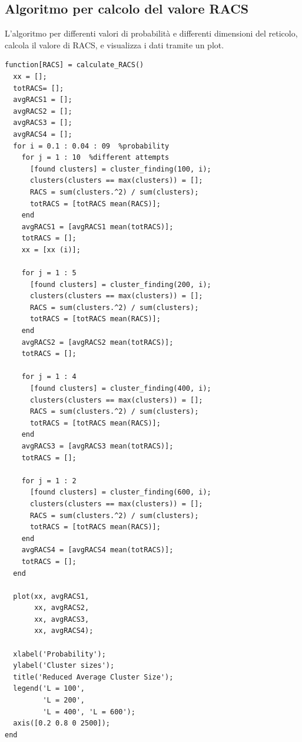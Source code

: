 \documentclass[10pt,a4paper]{article}
\begin{document}
\subsection{Algoritmo per calcolo del valore RACS}
L'algoritmo per differenti valori di probabilità e differenti dimensioni del reticolo, calcola il valore di RACS, e visualizza i dati tramite un plot.\\
\begin{lstlisting}[caption={calculate\_RACS.m}, label=usless]
function[RACS] = calculate_RACS()
  xx = [];
  totRACS= [];
  avgRACS1 = [];
  avgRACS2 = [];
  avgRACS3 = [];
  avgRACS4 = [];
  for i = 0.1 : 0.04 : 09  %probability
    for j = 1 : 10  %different attempts 
      [found clusters] = cluster_finding(100, i);
      clusters(clusters == max(clusters)) = [];
      RACS = sum(clusters.^2) / sum(clusters);
      totRACS = [totRACS mean(RACS)];
    end
    avgRACS1 = [avgRACS1 mean(totRACS)];
    totRACS = [];
    xx = [xx (i)];
        
    for j = 1 : 5
      [found clusters] = cluster_finding(200, i);
      clusters(clusters == max(clusters)) = [];
      RACS = sum(clusters.^2) / sum(clusters);
      totRACS = [totRACS mean(RACS)];
    end
    avgRACS2 = [avgRACS2 mean(totRACS)];
    totRACS = [];
        
    for j = 1 : 4
      [found clusters] = cluster_finding(400, i);
      clusters(clusters == max(clusters)) = [];
      RACS = sum(clusters.^2) / sum(clusters);
      totRACS = [totRACS mean(RACS)];
    end
    avgRACS3 = [avgRACS3 mean(totRACS)];
    totRACS = [];
        
    for j = 1 : 2
      [found clusters] = cluster_finding(600, i);
      clusters(clusters == max(clusters)) = [];
      RACS = sum(clusters.^2) / sum(clusters);
      totRACS = [totRACS mean(RACS)];
    end
    avgRACS4 = [avgRACS4 mean(totRACS)];
    totRACS = [];
  end
    
  plot(xx, avgRACS1, 
       xx, avgRACS2,
       xx, avgRACS3, 
       xx, avgRACS4);
       
  xlabel('Probability');
  ylabel('Cluster sizes');
  title('Reduced Average Cluster Size');
  legend('L = 100', 
         'L = 200', 
         'L = 400', 'L = 600'); 
  axis([0.2 0.8 0 2500]);
end
\end{lstlisting}
\end{document}
